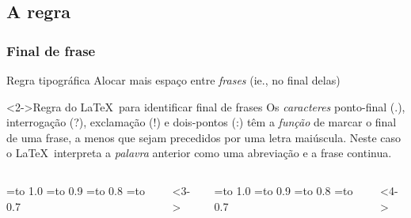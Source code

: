 \documentclass[handout,10pt]{beamer}
\begin{document}
\subsection{A regra}
\begin{frame}[fragile]
	\frametitle{Final de frase}
	
	\begin{block}{Regra tipográfica}
		Alocar mais espaço entre \emph{frases} (ie., no final delas)
	\end{block}\vfill
	
	\begin{block}<2->{Regra do \LaTeX\ para identificar final de frases}
		Os \emph{caracteres} ponto-final (.), interrogação (?),	exclamação (!) e
		dois-pontos (:) têm a \emph{função} de marcar o final de uma frase, a 
		menos que sejam precedidos por uma letra maiúscula. Neste caso o \LaTeX\
		interpreta a \emph{palavra} anterior como uma abreviação e a frase
		continua.
	\end{block}\vfill
	
	\begin{columns}
	
		\scriptsize
		\centering
	
			\centering
		
			=\hbox to 1.0\textwidth{Esta é uma oração. E outra.}
			=\hbox to 0.9\textwidth{Esta é uma oração. E outra.}
			=\hbox to 0.8\textwidth{Esta é uma oração. E outra.}
			=\hbox to 0.7\textwidth{Esta é uma oração. E outra.}	
			
			\begin{uncoverenv}<3->
			\end{uncoverenv}
		
		\column{0.05\textwidth}
			\centering
			\onslide<4->{\rule{0.1pt}{2cm}}
			
		\column{0.45\textwidth}
			\centering
			\setbox1=\hbox to 1.0\textwidth{Esta é uma oração, E outra.}
			=\hbox to 0.9\textwidth{Esta é uma oração, E outra.}
			=\hbox to 0.8\textwidth{Esta é uma oração, E outra.}
			=\hbox to 0.7\textwidth{Esta é uma oração, E outra.}
		
			\begin{uncoverenv}<4->
				\box2		
				\box3		
				\box4
			\end{uncoverenv}
			
	\end{columns}			
\end{frame}
\end{document}
